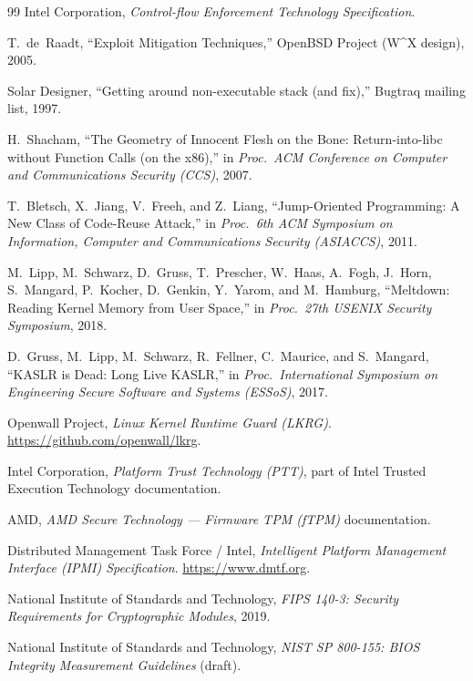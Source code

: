 \documentclass[11pt,a4paper]{article}
\begin{document}
\begin{thebibliography}{99}
 Intel Corporation, \emph{Control-flow Enforcement Technology Specification}.

 T.~de~Raadt, ``Exploit Mitigation Techniques,'' OpenBSD Project (W\textasciicircum X design), 2005.

 Solar Designer, ``Getting around non-executable stack (and fix),'' Bugtraq mailing list, 1997.

 H.~Shacham, ``The Geometry of Innocent Flesh on the Bone: Return-into-libc without Function Calls (on the x86),'' in \emph{Proc.\ ACM Conference on Computer and Communications Security (CCS)}, 2007.

 T.~Bletsch, X.~Jiang, V.~Freeh, and Z.~Liang, ``Jump-Oriented Programming: A New Class of Code-Reuse Attack,'' in \emph{Proc.\ 6th ACM Symposium on Information, Computer and Communications Security (ASIACCS)}, 2011.

 M.~Lipp, M.~Schwarz, D.~Gruss, T.~Prescher, W.~Haas, A.~Fogh, J.~Horn, S.~Mangard, P.~Kocher, D.~Genkin, Y.~Yarom, and M.~Hamburg, ``Meltdown: Reading Kernel Memory from User Space,'' in \emph{Proc.\ 27th USENIX Security Symposium}, 2018.

 D.~Gruss, M.~Lipp, M.~Schwarz, R.~Fellner, C.~Maurice, and S.~Mangard, ``KASLR is Dead: Long Live KASLR,'' in \emph{Proc.\ International Symposium on Engineering Secure Software and Systems (ESSoS)}, 2017.

 Openwall Project, \emph{Linux Kernel Runtime Guard (LKRG)}. \url{https://github.com/openwall/lkrg}.

 Intel Corporation, \emph{Platform Trust Technology (PTT)}, part of Intel Trusted Execution Technology documentation.

 AMD, \emph{AMD Secure Technology --- Firmware TPM (fTPM)} documentation.

 Distributed Management Task Force / Intel, \emph{Intelligent Platform Management Interface (IPMI) Specification}. \url{https://www.dmtf.org}.

 National Institute of Standards and Technology, \emph{FIPS 140-3: Security Requirements for Cryptographic Modules}, 2019.

 National Institute of Standards and Technology, \emph{NIST SP 800-155: BIOS Integrity Measurement Guidelines} (draft).


\end{thebibliography}
\end{document}

